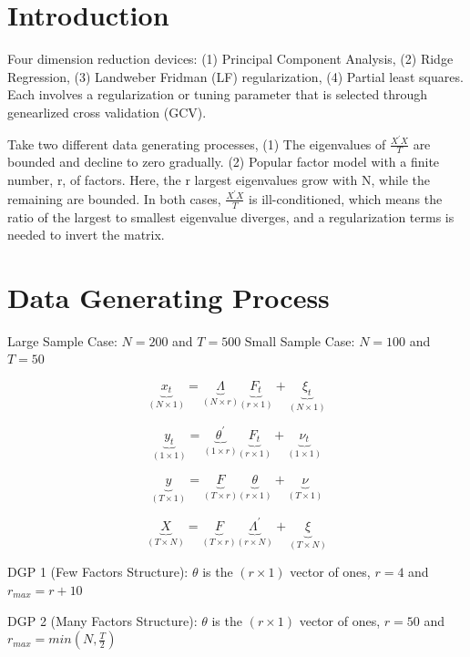 \renewcommand{\contentsname}{Table of Contents}
\tableofcontents

\newpage

\section{Introduction}

Four dimension reduction devices: (1) Principal Component Analysis, (2) Ridge Regression, (3) Landweber Fridman (LF) regularization, (4) Partial least squares. Each involves a regularization or tuning parameter that is selected through genearlized cross validation (GCV). 

Take two different data generating processes, (1) The eigenvalues of $\frac{X^{'}X}{T}$ are bounded and decline to zero gradually. (2) Popular factor model with a finite number, r, of factors. Here, the r largest eigenvalues grow with N, while the remaining are bounded. In both cases, $\frac{X^{'}X}{T}$ is ill-conditioned, which means the ratio of the largest to smallest eigenvalue diverges, and a regularization terms is needed to invert the matrix.

\section{Data Generating Process}

Large Sample Case: $N = 200$ and $T = 500$
Small Sample Case: $N = 100$ and $T = 50$

\[\underbrace{x_{t}}_{(N \times 1)} = \underbrace{\Lambda}_{(N \times r)} \underbrace{F_{t}}_{(r \times 1)} + \underbrace{\xi_{t}}_{(N \times 1)}\]

\[\underbrace{y_{t}}_{(1 \times 1)} = \underbrace{\theta^{'}}_{(1 \times r)} \underbrace{F_{t}}_{(r \times 1)} + \underbrace{\nu_{t}}_{(1 \times 1)}\]

\[\underbrace{y}_{(T \times 1)} = \underbrace{F}_{(T \times r)} \underbrace{\theta}_{(r \times 1)} + \underbrace{\nu}_{(T \times 1)}\]

\[\underbrace{X}_{(T \times N)} = \underbrace{F}_{(T \times r)} \underbrace{\Lambda^{'}}_{(r \times N)} + \underbrace{\xi}_{(T \times N)}\]

DGP 1 (Few Factors Structure):
$\theta$ is the $(r \times 1)$ vector of ones, $r = 4$ and $r_{max} = r + 10$

DGP 2 (Many Factors Structure):
$\theta$ is the $(r \times 1)$ vector of ones, $r = 50$ and $r_{max} = min(N, \frac{T}{2})$

